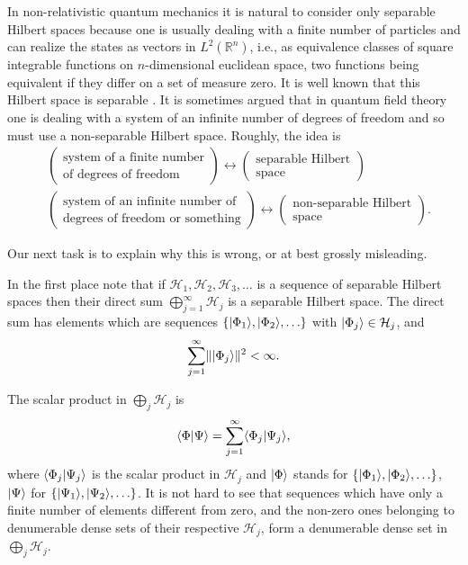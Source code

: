In non-relativistic quantum mechanics it is natural to consider only
separable Hilbert spaces because one is usually dealing with a finite number
of particles and can realize the states as vectors in $L^2(\mathbb{R}^n)$,
i.e., as equivalence classes of square integrable functions on $n$-dimensional
euclidean space, two functions being equivalent if they differ on a set of
measure zero.  It is well known that this Hilbert space is separable
\cite{pct-20}.
It is sometimes argued that in quantum field theory one is dealing with a
system of an infinite number of degrees of freedom and so must use a
non-separable Hilbert space.  Roughly, the idea is
\begin{equation*}
\begin{aligned}
&\left(\begin{array}{c}
  \text{system of a finite number}\\
  \text{of degrees of freedom}
\end{array}\right)
\longleftrightarrow
\left(\begin{array}{c}
  \text{separable Hilbert}\\
  \text{space}
\end{array}\right)\\[1ex]
&\left(\begin{array}{c}
  \text{system of an infinite number of}\\
  \text{degrees of freedom or something}
\end{array}\right)
\longleftrightarrow
\left(\begin{array}{c}
  \text{non-separable Hilbert}\\
  \text{space}
\end{array}\right).
\end{aligned}
\end{equation*}

Our next task is to explain why this is wrong, or at best grossly
misleading.

In the first place note that if $\mathcal{H}_1,\mathcal{H}_2,\mathcal{H}_3,\ldots$
is a sequence of separable Hilbert spaces then their direct sum
$\bigoplus_{j=1}^{\infty}\mathcal{H}_j$ is a separable Hilbert
space.  The direct sum has elements which are sequences
$\{\lvert \Phi_1\rangle,\lvert \Phi_2\rangle,\ldots\}$ with $\lvert \Phi_j\rangle\in\mathcal{H}_j$,
and
\begin{equation*}
  \sum_{j=1}^{\infty}\lVert\lvert \Phi_j\rangle\rVert^2<\infty.
\end{equation*}

The scalar product in $\bigoplus_j\mathcal{H}_j$ is
\begin{equation*}
  \langle \Phi\vert \Psi\rangle=\sum_{j=1}^{\infty}\langle \Phi_j\vert \Psi_j\rangle,
\end{equation*}
where $\langle \Phi_j\vert \Psi_j\rangle$ is the scalar product in $\mathcal{H}_j$ and
$\lvert \Phi\rangle$ stands for $\{\lvert \Phi_1\rangle,\lvert \Phi_2\rangle,\ldots\}$,
$\lvert \Psi\rangle$ for $\{\lvert \Psi_1\rangle,\lvert \Psi_2\rangle,\ldots\}$.  It is not hard to
see that sequences which have only a finite number of elements different from
zero, and the non-zero ones belonging to denumerable dense sets of their
respective $\mathcal{H}_j$, form a denumerable dense set in
$\bigoplus_j\mathcal{H}_j$.

